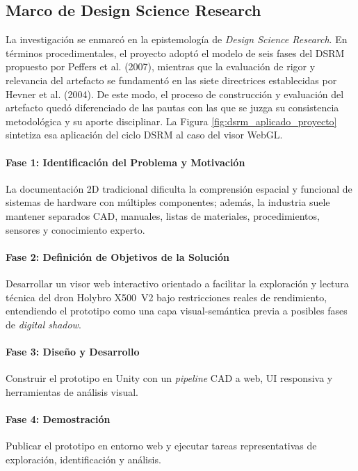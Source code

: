 \subsection{Marco de Design Science Research}

La investigación se enmarcó en la epistemología de \textit{Design Science Research}. En términos procedimentales, el proyecto adoptó el modelo de seis fases del DSRM propuesto por Peffers et al. (2007), mientras que la evaluación de rigor y relevancia del artefacto se fundamentó en las siete directrices establecidas por Hevner et al. (2004). De este modo, el proceso de construcción y evaluación del artefacto quedó diferenciado de las pautas con las que se juzga su consistencia metodológica y su aporte disciplinar. La Figura \ref{fig:dsrm_aplicado_proyecto} sintetiza esa aplicación del ciclo DSRM al caso del visor WebGL.

\paragraph{Fase 1: Identificación del Problema y Motivación} La documentación 2D tradicional dificulta la comprensión espacial y funcional de sistemas de hardware con múltiples componentes; además, la industria suele mantener separados CAD, manuales, listas de materiales, procedimientos, sensores y conocimiento experto.

\paragraph{Fase 2: Definición de Objetivos de la Solución} Desarrollar un visor web interactivo orientado a facilitar la exploración y lectura técnica del dron Holybro X500~V2 bajo restricciones reales de rendimiento, entendiendo el prototipo como una capa visual-semántica previa a posibles fases de \textit{digital shadow}.

\paragraph{Fase 3: Diseño y Desarrollo} Construir el prototipo en Unity con un \textit{pipeline} CAD a web, UI responsiva y herramientas de análisis visual.

\paragraph{Fase 4: Demostración} Publicar el prototipo en entorno web y ejecutar tareas representativas de exploración, identificación y análisis.

